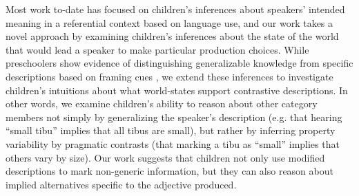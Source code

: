 \documentclass[man]{apa2}
\begin{document}
Most work to-date has focused on children's inferences about speakers' intended meaning in a referential context based on language use, and our work takes a novel approach by examining children's inferences about the state of the world that would lead a speaker to make particular production choices. While preschoolers show evidence of distinguishing generalizable knowledge from specific descriptions based on framing cues \cite{cimpian2009}, we extend these inferences to investigate children's intuitions about what world-states support contrastive descriptions.  In other words, we examine children's ability to reason about other category members not simply by generalizing the speaker's description (e.g. that hearing ``small tibu'' implies that all tibus are small), but rather by inferring property variability by pragmatic contrasts (that marking a tibu as ``small'' implies that others vary by size).  Our work suggests that children not only use modified descriptions to mark non-generic information, but they can also reason about implied alternatives specific to the adjective produced.

\end{document}
